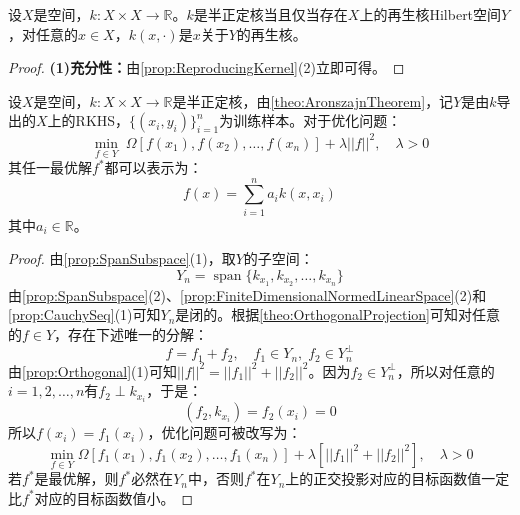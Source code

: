 \begin{theorem}\label{theo:AronszajnTheorem}
	设$X$是空间，$k:X\times X\to\mathbb{R}$。$k$是半正定核当且仅当存在$X$上的再生核Hilbert空间$Y$，对任意的$x\in X$，$k(x,\cdot)$是$x$关于$Y$的再生核。
\end{theorem}
\begin{proof}
	\textbf{(1)充分性：}由\cref{prop:ReproducingKernel}(2)立即可得。
\end{proof}
\begin{theorem}\label{theo:RepresentorTheorem}
	设$X$是空间，$k:X\times X\to\mathbb{R}$是半正定核，由\cref{theo:AronszajnTheorem}，记$Y$是由$k$导出的$X$上的RKHS，$\{(x_i,y_i)\}_{i=1}^{n}$为训练样本。对于优化问题：
	\begin{equation*}
		\min_{f\in Y}\;\Omega[f(x_1),f(x_2),\dots,f(x_n)]+\lambda||f||^2,\quad\lambda>0
	\end{equation*}
	其任一最优解$f^*$都可以表示为：
	\begin{equation*}
		f(x)=\sum_{i=1}^{n}a_ik(x,x_i)
	\end{equation*}
	其中$a_i\in\mathbb{R}$。
\end{theorem}
\begin{proof}
	由\cref{prop:SpanSubspace}(1)，取$Y$的子空间：
	\begin{equation*}
		Y_n=\operatorname{span}\{k_{x_1},k_{x_2},\dots,k_{x_n}\}
	\end{equation*}
	由\cref{prop:SpanSubspace}(2)、\cref{prop:FiniteDimensionalNormedLinearSpace}(2)和\cref{prop:CauchySeq}(1)可知$Y_n$是闭的。根据\cref{theo:OrthogonalProjection}可知对任意的$f\in Y$，存在下述唯一的分解：
	\begin{equation*}
		f=f_1+f_2,\quad f_1\in Y_n,\;f_2\in Y_n^{\perp}
	\end{equation*}
	由\cref{prop:Orthogonal}(1)可知$||f||^2=||f_1||^2+||f_2||^2$。因为$f_2\in Y_n^{\perp}$，所以对任意的$i=1,2,\dots,n$有$f_2\perp k_{x_i}$，于是：
	\begin{equation*}
		(f_2,k_{x_i})=f_2(x_i)=0
	\end{equation*}
	所以$f(x_i)=f_1(x_i)$，优化问题可被改写为：
	\begin{equation*}
		\min_{f\in Y}\Omega[f_1(x_1),f_1(x_2),\dots,f_1(x_n)]+\lambda[||f_1||^2+||f_2||^2],\quad\lambda>0
	\end{equation*}
	若$f^*$是最优解，则$f^*$必然在$Y_n$中，否则$f^*$在$Y_n$上的正交投影对应的目标函数值一定比$f^*$对应的目标函数值小。
\end{proof}